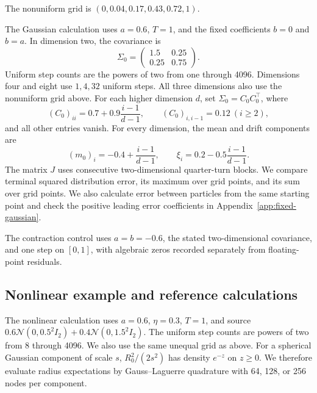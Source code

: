 The nonuniform grid is $(0,0.04,0.17,0.43,0.72,1)$.

The Gaussian calculation uses $a=0.6$, $T=1$, and the fixed coefficients $b=0$ and $b=a$. In dimension two, the covariance is
\begin{equation}
 \Sigma_0=\begin{pmatrix}1.5&0.25\\0.25&0.75\end{pmatrix}.
 \label{eq:numerical-covariance}
\end{equation} Uniform step counts are the powers of two from one through 4096. Dimensions four and eight use $1,4,32$ uniform steps. All three dimensions also use the nonuniform grid above. For each higher dimension $d$, set $\Sigma_0=C_0C_0^\top$, where
\[
 (C_0)_{ii}=0.7+0.9\frac{i-1}{d-1},\qquad (C_0)_{i,i-1}=0.12\ (i\ge2),
\]
and all other entries vanish. For every dimension, the mean and drift components are
\[
 (m_0)_i=-0.4+\frac{i-1}{d-1},\qquad
 \xi_i=0.2-0.5\frac{i-1}{d-1}.
\]
The matrix $J$ uses consecutive two-dimensional quarter-turn blocks. We compare terminal squared distribution error, its maximum over grid points, and its sum over grid points. We also calculate error between particles from the same starting point and check the positive leading error coefficients in Appendix~\ref{app:fixed-gaussian}.

The contraction control uses $a=b=-0.6$, the stated two-dimensional covariance, and one step on $[0,1]$, with algebraic zeros recorded separately from floating-point residuals.

\subsection{Nonlinear example and reference calculations}

The nonlinear calculation uses $a=0.6$, $\eta=0.3$, $T=1$, and source $0.6\mathcal N(0,0.5^2I_2)+0.4\mathcal N(0,1.5^2I_2)$. The uniform step counts are powers of two from 8 through 4096. We also use the same unequal grid as above. For a spherical Gaussian component of scale $s$, $R_0^2/(2s^2)$ has density $e^{-z}$ on $z\ge0$. We therefore evaluate radius expectations by Gauss--Laguerre quadrature with 64, 128, or 256 nodes per component.

